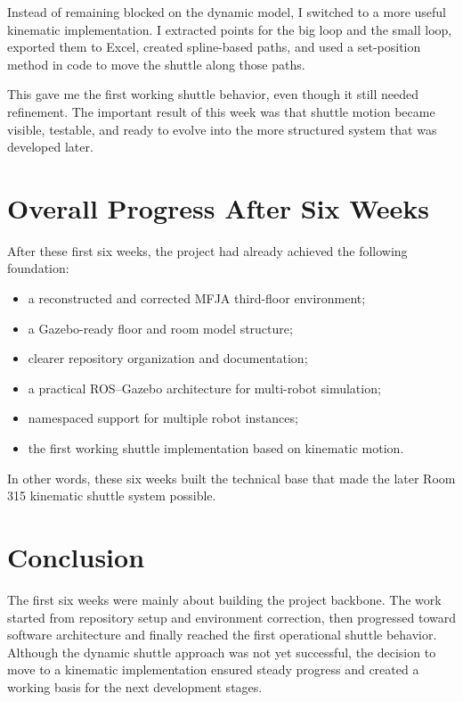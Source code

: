 \documentclass[11pt,a4paper]{article}
\begin{document}
Instead of remaining blocked on the dynamic model, I switched to a more useful
kinematic implementation. I extracted points for the big loop and the small
loop, exported them to Excel, created spline-based paths, and used a
set-position method in code to move the shuttle along those paths.

This gave me the first working shuttle behavior, even though it still needed
refinement. The important result of this week was that shuttle motion became
visible, testable, and ready to evolve into the more structured system that was
developed later.

\section*{Overall Progress After Six Weeks}

After these first six weeks, the project had already achieved the following
foundation:

\begin{itemize}
\item a reconstructed and corrected MFJA third-floor environment;
\item a Gazebo-ready floor and room model structure;
\item clearer repository organization and documentation;
\item a practical ROS--Gazebo architecture for multi-robot simulation;
\item namespaced support for multiple robot instances;
\item the first working shuttle implementation based on kinematic motion.
\end{itemize}

In other words, these six weeks built the technical base that made the later
Room 315 kinematic shuttle system possible.

\section*{Conclusion}

The first six weeks were mainly about building the project backbone. The work
started from repository setup and environment correction, then progressed toward
software architecture and finally reached the first operational shuttle
behavior. Although the dynamic shuttle approach was not yet successful, the
decision to move to a kinematic implementation ensured steady progress and
created a working basis for the next development stages.
\end{document}
